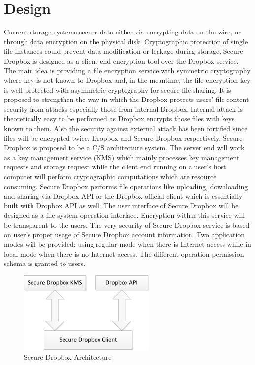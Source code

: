 \chapter{Design}

Current storage systems secure data either via encrypting data on the wire, or through data encryption on the physical disk\cite{ErikRiedelMaheshKallahalla2002}. Cryptographic protection of single file instances could prevent data modification or leakage during storage\cite{Vaquero2010}. Secure Dropbox is designed as a client end encryption tool over the Dropbox service. The main idea is providing a file encryption service with symmetric cryptography where key is not known to Dropbox and, in the meantime, the file encryption key is well protected with asymmetric cryptography for secure file sharing. It is proposed to strengthen the way in which the Dropbox protects users’ file content security from attacks especially those from internal Dropbox. Internal attack is theoretically easy to be performed as Dropbox encrypts those files with keys known to them. Also the security against external attack has been fortified since files will be encrypted twice, Dropbox and Secure Dropbox respectively. Secure Dropbox is proposed to be a C/S architecture system. The server end will work as a key management service (KMS) which mainly processes key management requests and storage request while the client end running on a user's host computer will perform cryptographic computations which are resource consuming. Secure Dropbox performs file operations like uploading, downloading and sharing via Dropbox API or the Dropbox official client which is essentially built with Dropbox API as well. The user interface of Secure Dropbox will be designed as a file system operation interface. Encryption within this service will be transparent to the users. The very security of Secure Dropbox service is based on user’s proper usage of Secure Dropbox account information. Two application modes will be provided: using regular mode when there is Internet access while in local mode when there is no Internet access. The different operation permission schema is granted to users.

\begin{figure}[h]
        \centering
        \includegraphics[width=0.6\textwidth]{figures/Secure_Dropbox_Architecture.png}
        \caption[Secure Dropbox Architecture] {Secure Dropbox Architecture}
\end{figure}

